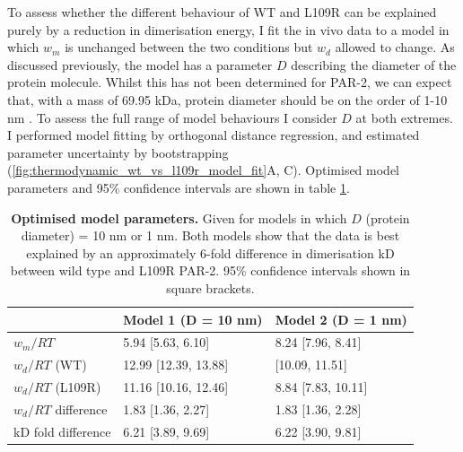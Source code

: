 \documentclass[12pt]{"report"}
\newcommand{\mycaption}[2]{\caption[#1]{\textbf{#1.} #2}}
\begin{document}



To assess whether the different behaviour of WT and L109R can be explained purely by a reduction in dimerisation energy, I fit the in vivo data to a model in which $w_m$ is unchanged between the two conditions but $w_d$ allowed to change. As discussed previously, the model has a parameter $D$ describing the diameter of the protein molecule. Whilst this has not been determined for PAR-2, we can expect that, with a mass of 69.95 kDa, protein diameter should be on the order of 1-10 nm \citep{Erickson2009}. To assess the full range of model behaviours I consider $D$ at both extremes.\\

I performed model fitting by orthogonal distance regression, and estimated parameter uncertainty by bootstrapping (\cref{fig:thermodynamic_wt_vs_l109r_model_fit}A, C). Optimised model parameters and 95\% confidence intervals are shown in table \ref{table:thermodynamic_model_parameters}.\\

\begin{table}[]
\begin{tabular}{|l|l|l|}
\hline
 & \textbf{Model 1 (D = 10 nm)} & \textbf{Model 2 (D = 1 nm)} \\ \hline
$w_m/RT$ & 5.94 {[}5.63, 6.10{]} & 8.24 {[}7.96, 8.41{]} \\ \hline
$w_d/RT$ (WT) & 12.99 {[}12.39, 13.88{]} &  {[}10.09, 11.51{]}\\ \hline
$w_d/RT$ (L109R) & 11.16 {[}10.16, 12.46{]} & 8.84 {[}7.83, 10.11{]} \\ \hline
$w_d/RT$ difference & 1.83 {[}1.36, 2.27{]} & 1.83 {[}1.36, 2.28{]} \\ \hline
kD fold difference & 6.21 {[}3.89, 9.69{]} & 6.22 {[}3.90, 9.81{]} \\ \hline
\end{tabular}

\mycaption{Optimised model parameters}{
Given for models in which $D$ (protein diameter) = 10 nm or 1 nm. Both models show that the data is best explained by an approximately 6-fold difference in dimerisation kD between wild type and L109R PAR-2. 95\% confidence intervals shown in square brackets.
}

\label{table:thermodynamic_model_parameters}
\end{table}
\end{document}
